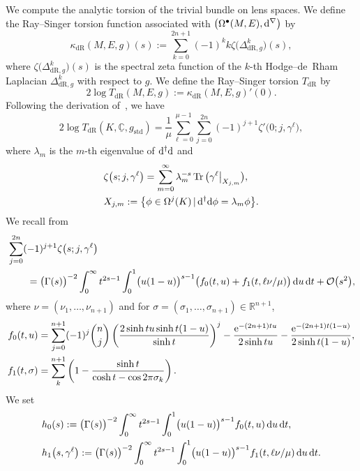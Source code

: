\documentclass[pdftex]{sigma}
\numberwithin{equation}{section}
\DeclareMathOperator{\Tr}{Tr}
\newcommand{\adjoint}{\dagger}
\newcommand{\deRham}{\mathrm{dR}}
\newcommand{\bR}{\mathbb{R}}
\newcommand{\bC}{\mathbb{C}}
\newcommand{\rest}[1]{\big\rvert_{#1}}
\begin{document}
We compute the analytic torsion of the trivial bundle on lens spaces.
We define the Ray--Singer torsion function associated with $\big(\Omega^{\bullet}(M,E) , {\rm d}^{\nabla}\big)$ by
\[
 \kappa_{\deRham} (M, E , g ) (s)
 := \sum_{k=0}^{2n+1} (-1)^k k \zeta \big(\Delta_{\deRham , g}^k \big) (s )
 ,
\]
where $\zeta \big(\Delta_{\deRham , g}^k \big) (s )$ is the spectral zeta function of the $k$-th Hodge--de~Rham Laplacian $\Delta_{\deRham , g}^k$
with respect to $g$.
We define the Ray--Singer torsion $T_{\deRham}$
by
\[
 2 \log T_{\deRham} (M, E , g )
 := \kappa_{\deRham} (M, E , g )' (0)
 .
\]
Following the derivation of~\cite[equation (3)]{Ray-70}, we have
\[
 2 \log T_{\deRham} ( K , \underline{\bC} , g_{\mathrm{std}} )
 =
 \frac{1}{\mu}
 \sum_{\ell = 0}^{\mu -1}
 \sum_{j=0}^{2n}
 (-1)^{j+1}
 \zeta ' \big(0 ; j, \gamma^{\ell} \big)
 ,
\]
where $\lambda_m$ is the $m$-th eigenvalue of ${\rm d}^{\adjoint} {\rm d}$
and
\begin{align*}
& \zeta \big(s ; j, \gamma^{\ell} \big)
 =
 \sum_{m=0}^{\infty}
 \lambda_m^{-s} \Tr \big( \gamma^{\ell} \rest{X_{j,m}}\big)
 ,
 \\
& X_{j,m}
 :=
 \big\{
 \phi \in \Omega^j (K)
 \,|\,
{\rm d}^{\adjoint} {\rm d} \phi = \lambda_m \phi
 \big\}
 .
\end{align*}
We recall from~\cite[p.~123]{Ray-70}
\begin{align*}
 &
 \sum_{j=0}^{2n}
 (-1)^{j+1}
 \zeta \big(s ; j, \gamma^{\ell} \big)
 \\
 & \qquad=
 \big(\Gamma (s)\big)^{-2}
 \int_0^{\infty} t^{2s-1}
 \int_0^1 \bigl( u(1-u) \bigr)^{s-1}
 \big(
 f_{0} (t, u)
 + f_{1} (t , \ell \nu / \mu )
 \big) \, {\rm d}u \, {\rm d}t
 + \mathcal{O} \big(s^2\big)
 ,
\end{align*}
where $\nu = (\nu_1 , \ldots , \nu_{n+1}) $ and for $\sigma = (\sigma_1 , \ldots , \sigma_{n+1} )\in \bR^{n+1}$,
\begin{align*}
 f_{0} (t, u)
 & =
 \sum_{j=0}^{n+1}
 (-1)^{j} \binom{n}{j}
 \left(
 \frac{
 2 \sinh t u \sinh t (1-u)
 }{
 \sinh t
 }
 \right)^{j}
 - \frac{{\rm e}^{-(2n+1)tu}}{2 \sinh tu}
 - \frac{{\rm e}^{-(2n+1)t(1-u)}}{2 \sinh t(1-u)}
 ,
 \\
 f_{1} (t , \sigma )
 & =
 \sum_{k}^{n+1}
 \left(
 1
 -
 \frac{
 \sinh t
 }{
 \cosh t - \cos 2 \pi \sigma_k
 }
 \right)
 .
\end{align*}
We set
\begin{align*}
& h_0 (s) :=
 \big(\Gamma (s)\big)^{-2}
 \int_0^{\infty} t^{2s-1}
 \int_0^1 \bigl( u(1-u) \bigr)^{s-1}
 f_0 (t,u ) \, {\rm d}u \, {\rm d}t
 ,
 \\
& h_1 \big(s , \gamma^{\ell}\big) :=
 \big(\Gamma (s)\big)^{-2}
 \int_0^{\infty} t^{2s-1}
 \int_0^1 \bigl( u(1-u) \bigr)^{s-1}
 f_1 (t, \ell \nu/\mu ) \, {\rm d}u \, {\rm d}t
 .
\end{align*}
\end{document}
